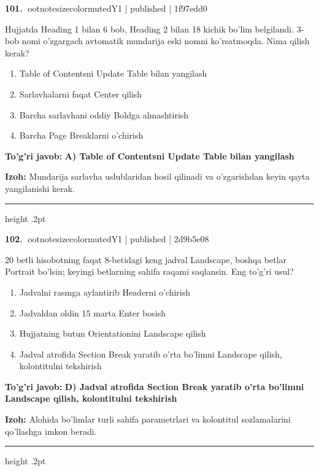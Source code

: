 \documentclass[10pt,a4paper]{article}
\begin{document}
\textbf{\color{ink}101.} {ootnotesizecolor{muted}Y1 | published | 1f97edd0}
\par
Hujjatda Heading 1 bilan 6 bob, Heading 2 bilan 18 kichik bo'lim belgilandi. 3-bob nomi o'zgargach avtomatik mundarija eski nomni ko'rsatmoqda. Nima qilish kerak?
\begin{enumerate}[label=\Alph*),leftmargin=9mm]
\item Table of Contentsni Update Table bilan yangilash
\item Sarlavhalarni faqat Center qilish
\item Barcha sarlavhani oddiy Boldga almashtirish
\item Barcha Page Breaklarni o'chirish
\end{enumerate}
\begin{tcolorbox}[enhanced,breakable,colback=teal!4,colframe=teal!55!black,boxrule=0.45pt,arc=1.2mm,left=2.8mm,right=2.8mm,top=2mm,bottom=2mm]
\textbf{\color{teal}To'g'ri javob:} \textbf{A) Table of Contentsni Update Table bilan yangilash}
\par\smallskip
\textbf{Izoh:} Mundarija sarlavha uslublaridan hosil qilinadi va o'zgarishdan keyin qayta yangilanishi kerak.
\end{tcolorbox}
\vspace{2mm}\hrule height .2pt\vspace{2mm}

\textbf{\color{ink}102.} {ootnotesizecolor{muted}Y1 | published | 2d9b5e08}
\par
20 betli hisobotning faqat 8-betidagi keng jadval Landscape, boshqa betlar Portrait bo'lsin; keyingi betlarning sahifa raqami saqlansin. Eng to'g'ri usul?
\begin{enumerate}[label=\Alph*),leftmargin=9mm]
\item Jadvalni rasmga aylantirib Headerni o'chirish
\item Jadvaldan oldin 15 marta Enter bosish
\item Hujjatning butun Orientationini Landscape qilish
\item Jadval atrofida Section Break yaratib o'rta bo'limni Landscape qilish, kolontitulni tekshirish
\end{enumerate}
\begin{tcolorbox}[enhanced,breakable,colback=teal!4,colframe=teal!55!black,boxrule=0.45pt,arc=1.2mm,left=2.8mm,right=2.8mm,top=2mm,bottom=2mm]
\textbf{\color{teal}To'g'ri javob:} \textbf{D) Jadval atrofida Section Break yaratib o'rta bo'limni Landscape qilish, kolontitulni tekshirish}
\par\smallskip
\textbf{Izoh:} Alohida bo'limlar turli sahifa parametrlari va kolontitul sozlamalarini qo'llashga imkon beradi.
\end{tcolorbox}
\vspace{2mm}\hrule height .2pt\vspace{2mm}
\end{document}
